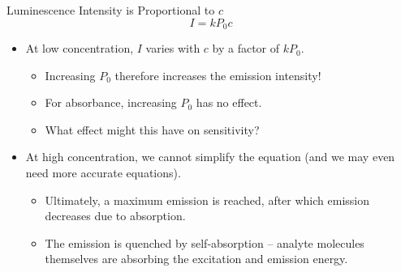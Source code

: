 \documentclass[notes=only]{beamer}
\begin{document}
\begin{frame}{Luminescence Intensity is Proportional to $c$}
	\begin{equation*}
		I = kP_0c
	\end{equation*}

	\begin{itemize}
		\item At \alert{low concentration}, $I$ varies with $c$ by a
			factor of $kP_0$.
			\begin{itemize}
				\item Increasing $P_0$ therefore increases the
					emission intensity!
				\item For absorbance, increasing $P_0$
					has no effect.
				\item What effect might this have on
					\alert{sensitivity}?
			\end{itemize}
		\item At \alert{high concentration}, we cannot simplify the
			equation (and we may even need more accurate equations).
			\begin{itemize}
				\item Ultimately, a maximum emission is reached,
					after which emission decreases due to
					absorption.
				\item The emission is \alert{quenched} by
					\alert{self-absorption} -- analyte
					molecules themselves are absorbing the
					excitation and emission energy.
			\end{itemize}
	\end{itemize}
\end{frame}

\end{document}
